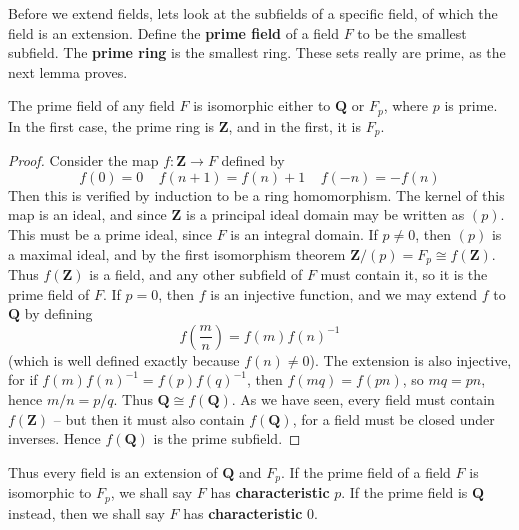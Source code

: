 Before we extend fields, lets look at the subfields of a specific field, of which the field is an extension. Define the {\bf prime field} of a field $F$ to be the smallest subfield. The {\bf prime ring} is the smallest ring. These sets really are prime, as the next lemma proves.

\begin{lemma}
    The prime field of any field $F$ is isomorphic either to $\mathbf{Q}$ or $F_p$, where $p$ is prime. In the first case, the prime ring is $\mathbf{Z}$, and in the first, it is $F_p$.
\end{lemma}
\begin{proof}
    Consider the map $f: \mathbf{Z} \to F$ defined by
    \[ f(0) = 0\ \ \ \ \ f(n+1) = f(n) + 1\ \ \ \ \ f(-n) = -f(n) \]
    Then this is verified by induction to be a ring homomorphism. The kernel of this map is an ideal, and since $\mathbf{Z}$ is a principal ideal domain may be written as $(p)$. This must be a prime ideal, since $F$ is an integral domain. If $p \neq 0$, then $(p)$ is a maximal ideal, and by the first isomorphism theorem $\mathbf{Z} / (p) = F_p \cong f(\mathbf{Z})$. Thus $f(\mathbf{Z})$ is a field, and any other subfield of $F$ must contain it, so it is the prime field of $F$. If $p = 0$, then $f$ is an injective function, and we may extend $f$ to $\mathbf{Q}$ by defining
    \[ f\left( \frac{m}{n} \right) = f(m) f(n)^{-1} \]
    (which is well defined exactly because $f(n) \neq 0$). The extension is also injective, for if $f(m) f(n)^{-1} = f(p) f(q)^{-1}$, then $f(mq) = f(pn)$, so $mq = pn$, hence $m/n = p/q$. Thus $\mathbf{Q} \cong f(\mathbf{Q})$. As we have seen, every field must contain $f(\mathbf{Z})$ -- but then it must also contain $f(\mathbf{Q})$, for a field must be closed under inverses. Hence $f(\mathbf{Q})$ is the prime subfield.
\end{proof}

Thus every field is an extension of $\mathbf{Q}$ and $F_p$. If the prime field of a field $F$ is isomorphic to $F_p$, we shall say $F$ has {\bf characteristic} $p$. If the prime field is $\mathbf{Q}$ instead, then we shall say $F$ has {\bf characteristic} 0.